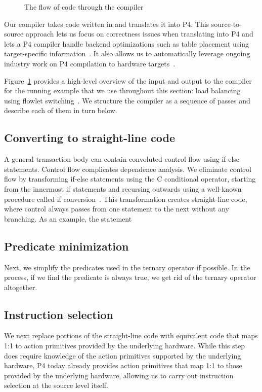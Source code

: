 \begin{figure}
\caption{The flow of code through the compiler}
\label{fig:flow}
\end{figure}

Our compiler takes code written in \pktlanguage and translates it into P4. This
source-to-source approach lets us focus on correctness issues when translating
\pktlanguage into P4 and lets a P4 compiler handle backend optimizations such
as table placement using target-specific information~\cite{lavanya_compiler}.
It also allows us to automatically leverage ongoing industry work on P4
compilation to hardware targets~\cite{xilinx}.

Figure~\ref{fig:flow} provides a high-level overview of the input and output to
the compiler for the running example that we use throughout this section: load
balancing using flowlet switching~\cite{flowlets}.  We structure the compiler
as a sequence of passes and describe each of them in turn below. 

\subsection{Converting to straight-line code}
A general transaction body can contain convoluted control flow using if-else
statements. Control flow complicates dependence analysis. We eliminate control
flow by transforming if-else statements using the C conditional operator,
starting from the innermost if statements and recursing outwards using a
well-known procedure called if conversion~\cite{allen_if_conversion}.  This
transformation creates straight-line code, where control always passes from one
statement to the next without any branching. As an example, the statement


\subsection{Predicate minimization}
Next, we simplify the predicates used in the ternary operator if possible.  In
the process, if we find the predicate is always true, we get rid of the ternary
operator altogether.

\subsection{Instruction selection}
We next replace portions of the straight-line code with equivalent code that
maps 1:1 to action primitives provided by the underlying hardware. While this
step does require knowledge of the action primitives supported by the
underlying hardware, P4 today already provides action primitives that map
1:1 to those provided by the underlying hardware, allowing us to carry out
instruction selection at the source level itself.

